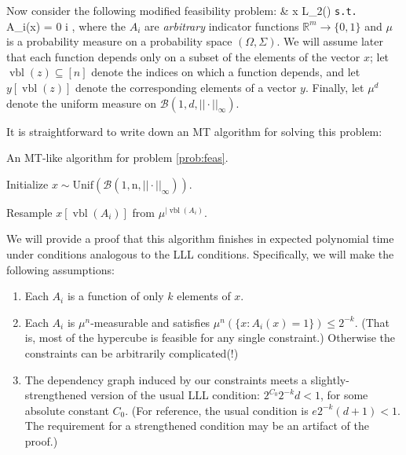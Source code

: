 \documentclass[twocolumn]{article}
\def\seqn#1\eeqn{\begin{align}#1\end{align}}
\newcommand{\hasDist}%
  {\sim}
\newcommand{\Reals}%
  {\mathbb{R}}
\begin{document}
\label{subsec:uncountable}
Now consider the following modified feasibility problem:
\seqn
  \label{prob:feas}
   & x \in L_2(\mu) \texttt{s.t.} \\ %
  A_i(x) = 0 \forall i \in [m] ,
\eeqn
where the $A_i$ are \emph{arbitrary} indicator functions $\Reals^{m} \to \{0,1\}$ and $\mu$ is a probability measure on a probability space $(\Omega, \Sigma)$.  We will assume later that each function depends only on a subset of the elements of the vector $x$; let $\operatorname{vbl}(z) \subseteq [n]$ denote the indices on which a function depends, and let $y[\operatorname{vbl}(z)]$ denote the corresponding elements of a vector $y$.  Finally, let $\mu^d$ denote the uniform measure on $\mathcal{B}(1, d, ||\cdot||_\infty)$.

It is straightforward to write down an MT algorithm for solving this problem:

\begin{algorithm}[H]
\caption{An MT-like algorithm for problem \ref{prob:feas}.}
\label{alg:mt-feas}
\begin{algorithmic}[1]

\State Initialize $x \hasDist \operatorname{Unif(\mathcal{B}(1, n, ||\cdot||_\infty))}$.
\EndFor

    \Return
  \EndIf
  \State Resample $x[\operatorname{vbl}(A_i)]$ from $\mu^{|\operatorname{vbl}(A_i)}$.
  \EndFor
\EndFunction

\end{algorithmic}
\end{algorithm}



We will provide a proof that this algorithm finishes in expected polynomial time under conditions analogous to the LLL conditions.  Specifically, we will make the following assumptions:
\begin{enumerate}
  \item Each $A_i$ is a function of only $k$ elements of $x$.  \label{eqn:feas-sparsity-condition}
  \item Each $A_i$ is $\mu^n$-measurable and satisfies $\mu^n(\{x: A_i(x) = 1\}) \leq 2^{-k}$.  (That is, most of the hypercube is feasible for any single constraint.)  Otherwise the constraints can be arbitrarily complicated(!)  \label{eqn:feas-margprob-condition}
  \item The dependency graph induced by our constraints meets a slightly-strengthened version of the usual LLL condition: $2^{C_0} 2^{-k} d < 1$, for some absolute constant $C_0$.  (For reference, the usual condition is $e 2^{-k} (d + 1) < 1$.  The requirement for a strengthened condition may be an artifact of the proof.) \label{eqn:feas-lowdep-condition}
\end{enumerate}
\end{document}
